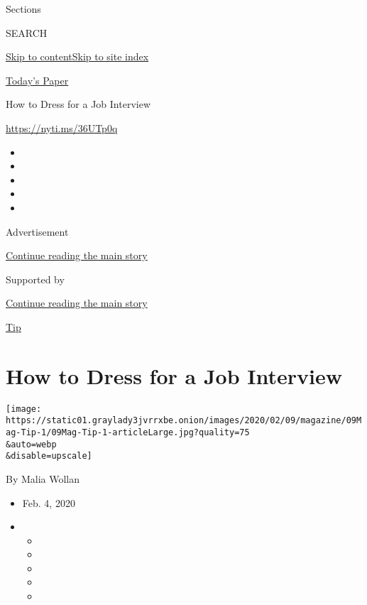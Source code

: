 Sections

SEARCH

\protect\hyperlink{site-content}{Skip to
content}\protect\hyperlink{site-index}{Skip to site index}

\href{https://myaccount.nytimes3xbfgragh.onion/auth/login?response_type=cookie\&client_id=vi}{}

\href{https://www.nytimes3xbfgragh.onion/section/todayspaper}{Today's
Paper}

How to Dress for a Job Interview

\url{https://nyti.ms/36UTp0q}

\begin{itemize}
\item
\item
\item
\item
\item
\end{itemize}

Advertisement

\protect\hyperlink{after-top}{Continue reading the main story}

Supported by

\protect\hyperlink{after-sponsor}{Continue reading the main story}

\href{/column/magazine-tip}{Tip}

\hypertarget{how-to-dress-for-a-job-interview}{%
\section{How to Dress for a Job
Interview}\label{how-to-dress-for-a-job-interview}}

\texttt{[image: https://static01.graylady3jvrrxbe.onion/images/2020/02/09/magazine/09Mag-Tip-1/09Mag-Tip-1-articleLarge.jpg?quality=75\\\&auto=webp\\\&disable=upscale]}

By Malia Wollan

\begin{itemize}
\item
  Feb. 4, 2020
\item
  \begin{itemize}
  \item
  \item
  \item
  \item
  \item
  \end{itemize}
\end{itemize}

